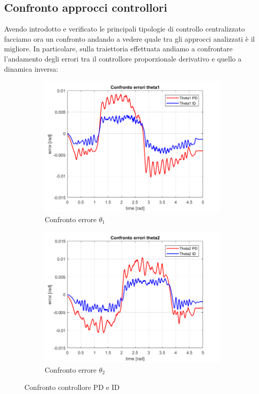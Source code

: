 \subsection{Confronto approcci controllori}
Avendo introdotto e verificato le principali tipologie di controllo centralizzato facciamo ora un confronto andando a vedere quale tra gli approcci analizzati è il migliore. In particolare, sulla traiettoria effettuata andiamo a confrontare l'andamento degli errori tra il controllore proporzionale derivativo e quello a dinamica inversa:
\begin{figure}[!ht]
\begin{subfigure}{.53\textwidth}
  \centering
  \includegraphics[width=.9\linewidth]{Immagini/Traiettorie/ConfontoErroriTheta1}  
  \caption{Confronto errore $\theta_1$ }
  \label{fig:sub-tid1}
\end{subfigure}
\begin{subfigure}{.53\textwidth}
  \centering
  \includegraphics[width=.9\linewidth]{Immagini/Traiettorie/ConfontoErroriTheta2}  
  \caption{Confronto errore $\theta_2$}
  \label{fig:sub-tid2}
\end{subfigure}
\caption{Confronto controllore PD e ID}
\end{figure}
